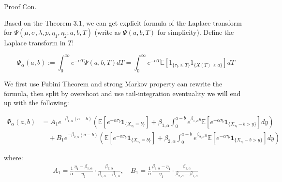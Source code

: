 \documentclass{beamer}
\begin{document}
\begin{frame}{Proof Con.}

    
    {\footnotesize \footnotesize
    \par Based on the Theorem 3.1, we can get explicit formula of the Laplace transform 
    for $\Psi(\mu, \sigma, \lambda, p, \eta_1, \eta_2; a, b, T)$ (write as $\Psi(a, b, T)$ for simplicity). Define the Laplace transform in \( T \):

    \[
    \Phi_\alpha(a, b) := \int_0^\infty e^{-\alpha T} \Psi(a, b, T)  dT = 
    \int_0^\infty e^{-\alpha T} \mathbb{E}[1_{\{\tau_b \leq T\}} 1_{\{X(T) \geq a\}}]  dT
    \]

    \par We first use Fubini Theorem and strong Markov property can rewrite the formula, then split by overshoot and use tail-integration eventuality
    we will end up with the following:
    {\footnotesize \tiny
    \begin{align*}
        \Phi_\alpha(a,b) &= A_1 e^{-\beta_{1,\alpha}(a-b)} \left( \mathbb{E} \left[ e^{-\alpha\tau_b} \mathbf{1}_{\{X_{\tau_b}=b\}} \right] +
         \beta_{1,\alpha} \int_0^{a-b} e^{\beta_{1,\alpha}y} \mathbb{E} \left[ e^{-\alpha\tau_b} \mathbf{1}_{\{X_{\tau_b}-b>y\}} \right] dy \right) \\
        &\quad + B_1 e^{-\beta_{2,\alpha}(a-b)} \left( \mathbb{E} \left[ e^{-\alpha\tau_b} \mathbf{1}_{\{X_{\tau_b}=b\}} \right]
        + \beta_{2,\alpha} \int_0^{a-b} e^{\beta_{2,\alpha}y} \mathbb{E} \left[ e^{-\alpha\tau_b} \mathbf{1}_{\{X_{\tau_b}-b>y\}} \right] dy \right)
    \end{align*}
    

    }
    \par where:
    {\footnotesize \tiny
    \begin{align*}
        A_1 = \frac{1}{\alpha} \frac{\eta_1 - \beta_{1,\alpha}}{\eta_1} \cdot \frac{\beta_{2,\alpha}}{\beta_{2,\alpha} - \beta_{1,\alpha}}, 
        \quad B_1 = \frac{1}{\alpha} \frac{\beta_{2,\alpha} - \eta_1}{\eta_1} \cdot \frac{\beta_{1,\alpha}}{\beta_{2,\alpha} - \beta_{1,\alpha}}
    \end{align*}
    }
    }
    
\end{frame}
\end{document}
